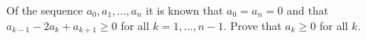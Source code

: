 Of the sequence $a_0, a_1, \ldots, a_n$ it is known that $a_0 = a_n = 0$ and that $a_{k-1} - 2a_k + a_{k+1} \geq 0$ for all $k = 1, \ldots, n-1$. Prove that $a_k \geq 0$ for all $k$.
